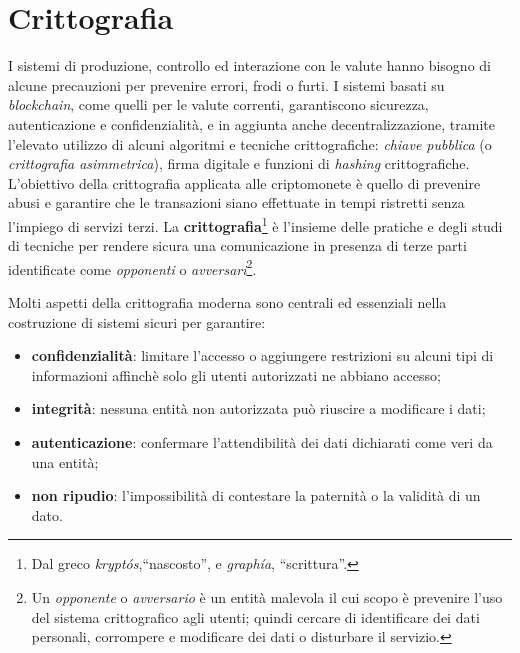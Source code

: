 \chapter{Crittografia}

I sistemi di produzione, controllo ed interazione con le valute hanno bisogno di alcune precauzioni per prevenire errori, frodi o furti.
I sistemi basati su \textit{blockchain}, come quelli per le valute correnti, garantiscono sicurezza, autenticazione e confidenzialità, e in aggiunta anche decentralizzazione, tramite l'elevato utilizzo di alcuni algoritmi e tecniche crittografiche: \textit{chiave pubblica} (o \textit{crittografia asimmetrica}), firma digitale e funzioni di \textit{hashing} crittografiche.\newline
L'obiettivo della crittografia applicata alle criptomonete è quello di prevenire abusi e garantire che le transazioni siano effettuate in tempi ristretti senza l'impiego di servizi terzi.\newline\newline
La \textbf{crittografia}\footnote{Dal greco \textit{kryptós},``nascosto'', e \textit{graphía}, ``scrittura''.} è l'insieme delle pratiche e degli studi di tecniche per rendere sicura una comunicazione in presenza di terze parti identificate come \emph{opponenti} o \emph{avversari}\footnote{Un \textit{opponente} o \textit{avversario} è un entità malevola il cui scopo è prevenire l'uso del sistema crittografico agli utenti; quindi cercare di identificare dei dati personali, corrompere e modificare dei dati o disturbare il servizio.}.

Molti aspetti della crittografia moderna sono centrali ed essenziali nella costruzione di sistemi sicuri per garantire:
\begin{itemize}
    \item \textbf{confidenzialità}: limitare l'accesso o aggiungere restrizioni su alcuni tipi di informazioni affinchè solo gli utenti autorizzati ne abbiano accesso;
    \item \textbf{integrità}: nessuna entità non autorizzata può riuscire a modificare i dati;
    \item \textbf{autenticazione}: confermare l'attendibilità dei dati dichiarati come veri da una entità;
    \item \textbf{non ripudio}: l'impossibilità di contestare la paternità o la validità di un dato.
\end{itemize}

